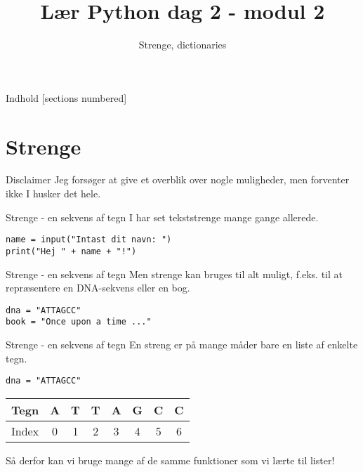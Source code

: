 \documentclass[main.tex]{subfiles}
\title{Lær Python dag 2 - modul 2}
\subtitle{Strenge, dictionaries}
\begin{document}
\maketitle

\begin{frame}{Indhold}
  [sections numbered]
  \tableofcontents[hideallsubsections]
\end{frame}

\section{Strenge}
\begin{frame}[fragile]{Disclaimer}
Jeg forsøger at give et overblik over nogle muligheder, men forventer ikke I husker det hele.

\end{frame}


\begin{frame}[fragile]{Strenge - en sekvens af tegn}
	I har set tekststrenge mange gange allerede.
	\begin{lstlisting}[style=python]
name = input("Intast dit navn: ")
print("Hej " + name + "!")
	\end{lstlisting}
\end{frame}

\begin{frame}[fragile]{Strenge - en sekvens af tegn}
	Men strenge kan bruges til alt muligt, f.eks. til at repræsentere en DNA-sekvens eller en bog.
	\begin{lstlisting}[style=python]
dna = "ATTAGCC"
book = "Once upon a time ..."
	\end{lstlisting}
\end{frame}

\begin{frame}[fragile]{Strenge - en sekvens af tegn}
	En streng er på mange måder bare en liste af enkelte tegn.
	\begin{lstlisting}[style=python]
dna = "ATTAGCC"
	\end{lstlisting}
	\begin{tabular}{|l|c|c|c|c|c|c|c|}
		\hline
		Tegn 	& A & T & T & A & G & C & C \\
		\hline
		Index 	& 0 & 1 & 2 & 3 & 4 & 5 & 6 \\
		\hline
	\end{tabular}
\pause

Så derfor kan vi bruge mange af de samme funktioner som vi lærte til lister!
\end{frame}
\end{document}
